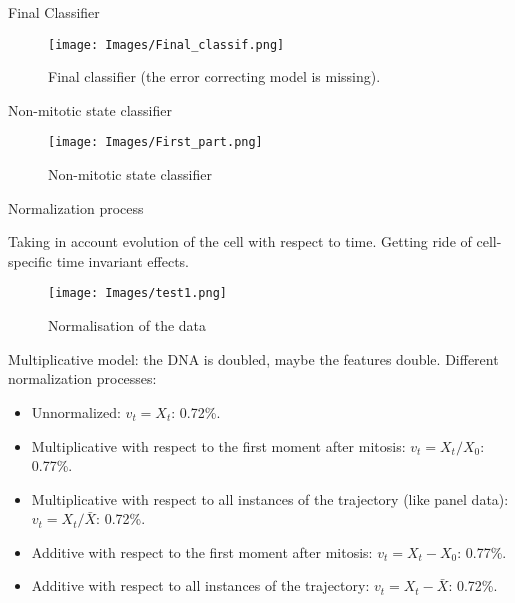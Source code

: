 \documentclass{beamer}
\begin{document}
\begin{frame}{Final Classifier}
\begin{figure}[!ht]
\centering
\texttt{[image: Images/Final\_classif.png]}
\caption{Final classifier (the error correcting model is missing).}
\label{Final_classifier}
\end{figure}
\end{frame}

\begin{frame}{Non-mitotic state classifier}
\begin{figure}[!ht]
\centering
\texttt{[image: Images/First\_part.png]}
\caption{Non-mitotic state classifier}
\label{Non-mitotic state classifier}
\end{figure}
\end{frame}

\begin{frame}{Normalization process}
\begin{footnotesize}
Taking in account evolution of the cell with respect to time. Getting ride of cell-specific time invariant effects.

\begin{figure}[!ht]
\centering
\texttt{[image: Images/test1.png]}
\caption{Normalisation of the data}
\label{normalization}
\end{figure}

Multiplicative model: the DNA is doubled, maybe the features double. Different normalization processes:
\begin{itemize}
\item Unnormalized: $v_t=X_t$: 0.72\%. 
\item Multiplicative with respect to the first moment after mitosis: $v_t=X_t/X_0$: 0.77\%.
\item Multiplicative with respect to all instances of the trajectory (like panel data):  $v_t=X_t/\bar{X}$: 0.72\%.
\item Additive with respect to the first moment after mitosis:  $v_t=X_t-X_0$: 0.77\%.
\item Additive with respect to all instances of the trajectory: $v_t=X_t-\bar{X}$: 0.72\%.
\end{itemize}
\end{footnotesize}
\end{frame}
\end{document}

